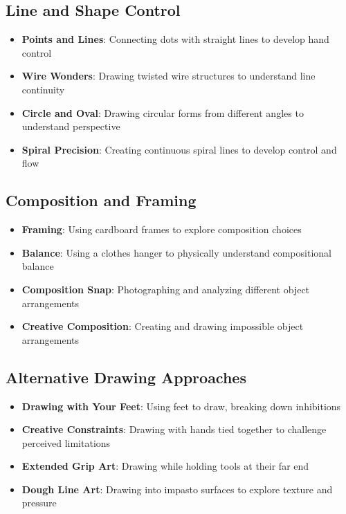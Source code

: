 \documentclass{article}
\begin{document}
\subsection{Line and Shape Control}
\begin{itemize}
    \item \textbf{Points and Lines}: Connecting dots with straight lines to develop hand control
    \item \textbf{Wire Wonders}: Drawing twisted wire structures to understand line continuity
    \item \textbf{Circle and Oval}: Drawing circular forms from different angles to understand perspective
    \item \textbf{Spiral Precision}: Creating continuous spiral lines to develop control and flow
\end{itemize}

\subsection{Composition and Framing}
\begin{itemize}
    \item \textbf{Framing}: Using cardboard frames to explore composition choices
    \item \textbf{Balance}: Using a clothes hanger to physically understand compositional balance
    \item \textbf{Composition Snap}: Photographing and analyzing different object arrangements
    \item \textbf{Creative Composition}: Creating and drawing impossible object arrangements
\end{itemize}

\subsection{Alternative Drawing Approaches}
\begin{itemize}
    \item \textbf{Drawing with Your Feet}: Using feet to draw, breaking down inhibitions
    \item \textbf{Creative Constraints}: Drawing with hands tied together to challenge perceived limitations
    \item \textbf{Extended Grip Art}: Drawing while holding tools at their far end
    \item \textbf{Dough Line Art}: Drawing into impasto surfaces to explore texture and pressure
\end{itemize}
\end{document}
